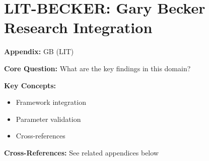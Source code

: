 

\chapter{LIT-BECKER: Gary Becker Research Integration}
\label{app:lit-becker}


\begin{tcolorbox}[colback=blue!5!white, colframe=blue!75!black,
    title=Quick Reference: Appendix GB]

\textbf{Appendix:} GB (LIT)

\textbf{Core Question:} What are the key findings in this domain?

\textbf{Key Concepts:}
\begin{itemize}[nosep]
\item Framework integration
\item Parameter validation
\item Cross-references
\end{itemize}

\textbf{Cross-References:} See related appendices below
\end{tcolorbox}

